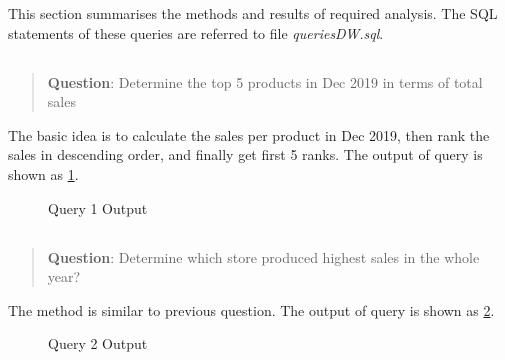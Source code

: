 \documentclass[
  a4paper,
]{article}
\begin{document}
This section summarises the methods and results of required analysis.
The SQL statements of these queries are referred to file
\emph{queriesDW.sql}.

\let\oldsubsection\thesubsection
\renewcommand*{\thesubsection}{Question~\arabic{subsection}}

\hypertarget{section}{%
\subsection{}\label{section}}

\begin{quote}
\textbf{Question}: Determine the top 5 products in Dec 2019 in terms of
total sales
\end{quote}

The basic idea is to calculate the sales per product in Dec 2019, then
rank the sales in descending order, and finally get first 5 ranks. The
output of query is shown as \cref{fig:q1-output}.

\begin{figure}
    \centering
    \caption{Query 1 Output\label{fig:q1-output}}
\end{figure}

\hypertarget{section-1}{%
\subsection{}\label{section-1}}

\begin{quote}
\textbf{Question}: Determine which store produced highest sales in the
whole year?
\end{quote}

The method is similar to previous question. The output of query is shown
as \cref{fig:q2-output}.

\begin{figure}
    \centering
    \caption{Query 2 Output\label{fig:q2-output}}
\end{figure}
\end{document}
